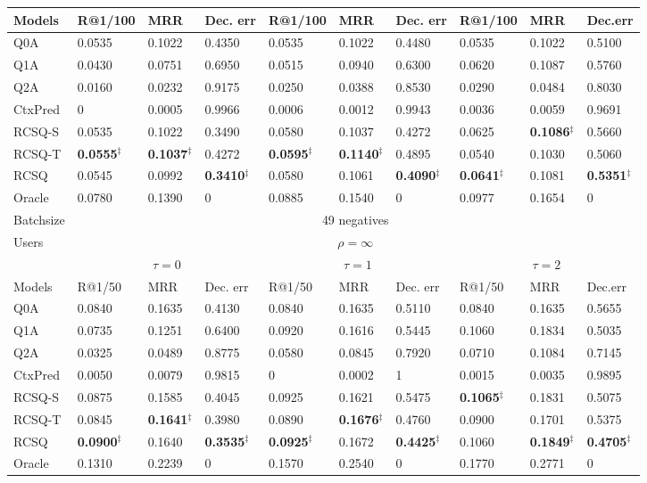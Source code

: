 \documentclass[format=acmsmall, review=False, screen=true]{acmart}
\begin{document}
\begin{table}
{\begin{tabular}{l|l|l|l|l|l|l|l|l|l}
Models  & R@1/100     & MRR    & Dec. err    & R@1/100     & MRR    & Dec. err & R@1/100 & MRR & Dec.err \\ \hline
Q0A     & 0.0535 &0.1022 & 0.4350 &  0.0535 & 0.1022 & 0.4480 & 0.0535 & 0.1022 & 0.5100 \\ 
Q1A   & 0.0430 &  0.0751 & 0.6950  & 0.0515 & 0.0940 & 0.6300 & 0.0620 & 0.1087 & 0.5760 \\ 
Q2A     & 0.0160 & 0.0232 & 0.9175  & 0.0250 & 0.0388 & 0.8530 & 0.0290 & 0.0484 & 0.8030  \\ 
CtxPred & 0 & 0.0005 & 0.9966    & 0.0006 & 0.0012 & 0.9943 & 0.0036 &  0.0059 & 0.9691\\ \hline
RCSQ-S     & 0.0535 & 0.1022 & 0.3490 &0.0580 & 0.1037 & 0.4272 & 0.0625 &  \textbf{0.1086}$^{\ddag}$& 0.5660 \\ 
RCSQ-T     & \textbf{0.0555}$^{\ddag}$ & \textbf{0.1037}$^{\ddag}$ &  0.4272 & \textbf{0.0595}$^{\ddag}$ & \textbf{0.1140}$^{\ddag}$ & 0.4895 & 0.0540 & 0.1030 &  0.5060 \\ 
RCSQ     & 0.0545 & 0.0992 & \textbf{0.3410}$^{\ddag}$ &  0.0580& 0.1061 & \textbf{0.4090}$^{\ddag}$ &  \textbf{0.0641}$^{\ddag}$ & 0.1081 & \textbf{0.5351}$^{\ddag}$  \\ \hline
Oracle  & 0.0780 & 0.1390 & 0  & 0.0885 & 0.1540 & 0 & 0.0977  & 0.1654 & 0 \\ 
\hline\hline
Batchsize & \multicolumn{9}{c}{49 negatives} \\
\hline
\multirow{2}{*}{Users}  & \multicolumn{9}{c}{$\rho=\infty$} \\ 
\cline{2-10}  

   &  \multicolumn{3}{c|}{$\tau=0$} & \multicolumn{3}{c|}{$\tau=1$} & \multicolumn{3}{c}{$\tau=2$}\\ \hline
Models  & R@1/50    & MRR    & Dec. err    & R@1/50     & MRR    & Dec. err & R@1/50 & MRR & Dec.err \\ \hline
Q0A & 0.0840 & 0.1635 &0.4130& 0.0840& 0.1635& 0.5110&  0.0840 &0.1635 &0.5655  \\ 
Q1A & 0.0735& 0.1251& 0.6400 & 0.0920& 0.1616 &0.5445& 0.1060& 0.1834 &0.5035 \\ 
Q2A & 0.0325 &0.0489 &0.8775& 0.0580& 0.0845 &0.7920& 0.0710 &0.1084 &0.7145 \\ 
CtxPred & 0.0050& 0.0079& 0.9815& 0& 0.0002& 1& 0.0015& 0.0035 &0.9895\\ \hline
RCSQ-S  & 0.0875 &0.1585 &0.4045 & 0.0925& 0.1621& 0.5475& \textbf{0.1065}$^{\ddag}$ &0.1831 &0.5075\\ 
RCSQ-T  & 0.0845 &\textbf{0.1641}$^{\ddag}$ &0.3980 & 0.0890& \textbf{0.1676}$^{\ddag}$ &0.4760& 0.0900 &0.1701 &0.5375 \\
RCSQ &\textbf{0.0900}$^{\ddag}$ &0.1640& \textbf{0.3535}$^{\ddag}$ & \textbf{0.0925}$^{\ddag}$& 0.1672& \textbf{0.4425}$^{\ddag}$ & 0.1060 &\textbf{0.1849}$^{\ddag}$& \textbf{0.4705}$^{\ddag}$ \\ \hline
Oracle  & 0.1310 &0.2239 &0& 0.1570 &0.2540 &0& 0.1770& 0.2771 &0\\ 
\hline\hline


\end{tabular}}
\end{table}
\end{document}
